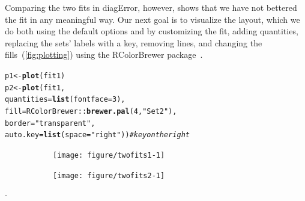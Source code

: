 \documentclass[
  oneside,
  openany,
  numbers=noendperiod,
  parskip=half,
  bibliography=totoc
]{scrbook}\usepackage[]{graphicx}\usepackage{xcolor}
\makeatletter
\newcommand{\hlnum}[1]{\textcolor[rgb]{0.686,0.059,0.569}{#1}}%
\newcommand{\hlstr}[1]{\textcolor[rgb]{0.192,0.494,0.8}{#1}}%
\newcommand{\hlcom}[1]{\textcolor[rgb]{0.678,0.584,0.686}{\textit{#1}}}%
\newcommand{\hlopt}[1]{\textcolor[rgb]{0,0,0}{#1}}%
\newcommand{\hlstd}[1]{\textcolor[rgb]{0.345,0.345,0.345}{#1}}%
\newcommand{\hlkwb}[1]{\textcolor[rgb]{0.69,0.353,0.396}{#1}}%
\newcommand{\hlkwc}[1]{\textcolor[rgb]{0.333,0.667,0.333}{#1}}%
\newcommand{\hlkwd}[1]{\textcolor[rgb]{0.737,0.353,0.396}{\textbf{#1}}}%
\newenvironment{kframe}{%
 \def\at@end@of@kframe{}%
 \ifinner\ifhmode%
  \def\at@end@of@kframe{\end{minipage}}%
  \begin{minipage}{\columnwidth}%
 \fi\fi%
 \def\FrameCommand##1{\hskip\@totalleftmargin \hskip-\fboxsep
 \colorbox{shadecolor}{##1}\hskip-\fboxsep
     \hskip-\linewidth \hskip-\@totalleftmargin \hskip\columnwidth}%
 \MakeFramed {\advance\hsize-\width
   \@totalleftmargin\z@ \linewidth\hsize
   \@setminipage}}%
 {\par\unskip\endMakeFramed%
 \at@end@of@kframe}
\newenvironment{knitrout}{}{} %
\newlength{\overhang}
\newenvironment{fullwidth}{%
  \blockmargin
  \begin{addmargin*}[0em]{-\overhang}%
}{%
  \end{addmargin*}%
  \unblockmargin
}
\newcommand{\pkg}[1]{{\fontseries{b}\selectfont #1}}
\makeatother
\begin{document}
Comparing the two fits in diagError, however, shows that we have not bettered
the fit in any meaningful way. Our next goal is to visualize the layout, which
we do both using the default options and by customizing the fit, adding
quantities, replacing the sets' labels with a key, removing lines, and changing the
fills~(\cref{fig:plotting}) using the \pkg{RColorBrewer} package~\citep{Neuwirth_2014}.

\begin{knitrout}\small
{}\color{fgcolor}\begin{kframe}
\begin{alltt}
\hlstd{p1} \hlkwb{<-} \hlkwd{plot}\hlstd{(fit1)}
\hlstd{p2} \hlkwb{<-} \hlkwd{plot}\hlstd{(fit1,}
           \hlkwc{quantities} \hlstd{=} \hlkwd{list}\hlstd{(}\hlkwc{fontface} \hlstd{=} \hlnum{3}\hlstd{),}
           \hlkwc{fill} \hlstd{= RColorBrewer}\hlopt{::}\hlkwd{brewer.pal}\hlstd{(}\hlnum{4}\hlstd{,} \hlstr{"Set2"}\hlstd{),}
           \hlkwc{border} \hlstd{=} \hlstr{"transparent"}\hlstd{,}
           \hlkwc{auto.key} \hlstd{=} \hlkwd{list}\hlstd{(}\hlkwc{space} \hlstd{=} \hlstr{"right"}\hlstd{))} \hlcom{# key on the right}
\end{alltt}
\end{kframe}
\end{knitrout}

\begin{figure}[hbtp]
\caption{The same fit visualized in two distinct ways.\label{fig:plotting}}
\begin{subfigure}[b]{.4\linewidth}
\begin{knitrout}\small
{}\color{fgcolor}

{\centering \texttt{[image: figure/twofits1-1]} 

}



\end{knitrout}
\end{subfigure}%
\begin{subfigure}[b]{.6\linewidth}
\begin{knitrout}\small
{}\color{fgcolor}

{\centering \texttt{[image: figure/twofits2-1]} 

}



\end{knitrout}
\end{subfigure}
\end{figure}

\begin{fullwidth}


\end{fullwidth}
\end{document}
